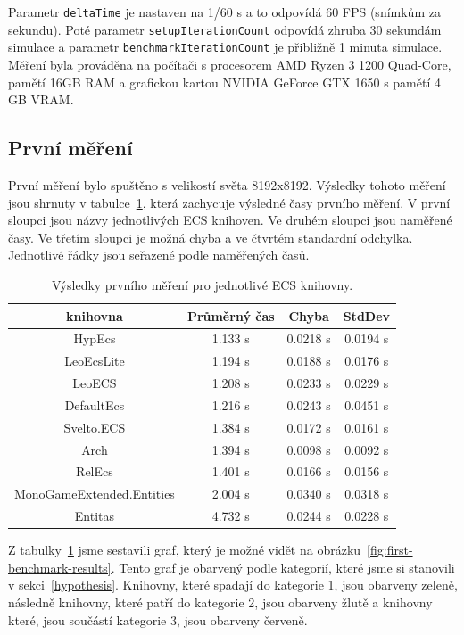 Parametr \texttt{deltaTime} je nastaven na 1/60 s a to odpovídá 60 FPS (snímkům za sekundu). Poté parametr \texttt{setupIterationCount} odpovídá zhruba 30 sekundám simulace a parametr \texttt{benchmarkIterationCount} je přibližně 1 minuta simulace. Měření byla prováděna na počítači s procesorem AMD Ryzen 3 1200 Quad-Core, pamětí 16GB RAM a grafickou kartou NVIDIA GeForce GTX 1650 s pamětí 4 GB VRAM.

\subsection{První měření}
První měření bylo spuštěno s velikostí světa 8192x8192. Výsledky tohoto měření jsou shrnuty v tabulce~\ref{tab:first-benchmark-results}, která zachycuje výsledné časy prvního měření. V první sloupci jsou názvy jednotlivých ECS knihoven. Ve druhém sloupci jsou naměřené časy. Ve třetím sloupci je možná chyba a ve čtvrtém standardní odchylka. Jednotlivé řádky jsou seřazené podle naměřených časů.

\begin{table}[!htb]
    \centering\footnotesize\sf
    \begin{tabular}{c c c c}
        \toprule
        knihovna & Průměrný čas & Chyba & StdDev \\
        \midrule
        HypEcs & 1.133 s & 0.0218 s & 0.0194 s \\
        LeoEcsLite & 1.194 s & 0.0188 s & 0.0176 s \\
        LeoECS & 1.208 s & 0.0233 s & 0.0229 s \\
        DefaultEcs & 1.216 s & 0.0243 s & 0.0451 s \\
        Svelto.ECS & 1.384 s & 0.0172 s & 0.0161 s \\
        Arch & 1.394 s & 0.0098 s & 0.0092 s \\
        RelEcs & 1.401 s & 0.0166 s & 0.0156 s \\
        MonoGameExtended.Entities & 2.004 s & 0.0340 s & 0.0318 s \\
        Entitas & 4.732 s & 0.0244 s & 0.0228 s \\
        \bottomrule
    \end{tabular}
    \caption{Výsledky prvního měření pro jednotlivé ECS knihovny.}
    \label{tab:first-benchmark-results}
\end{table}

Z tabulky~\ref{tab:first-benchmark-results} jsme sestavili graf, který je možné vidět na obrázku~\ref{fig:first-benchmark-results}. Tento graf je obarvený podle kategorií, které jsme si stanovili v sekci~\ref{hypothesis}. Knihovny, které spadají do kategorie 1, jsou obarveny zeleně, následně knihovny, které patří do kategorie 2, jsou obarveny žlutě a knihovny které, jsou součástí kategorie 3, jsou obarveny červeně.


